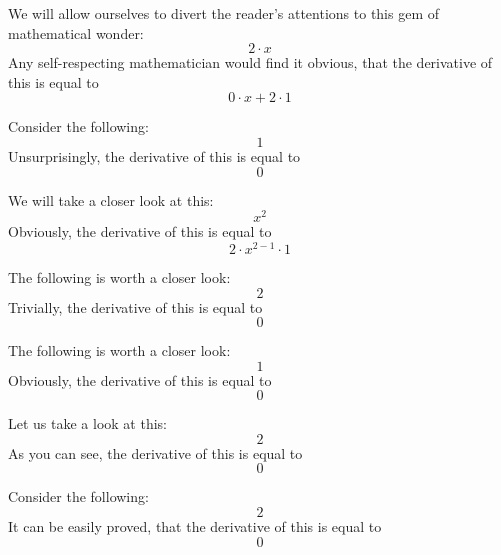 \documentclass{article}
\begin{document}
We will allow ourselves to divert the reader's attentions to this gem of mathematical wonder:
\begin{equation}
2 \cdot x 
\end{equation}
Any self-respecting mathematician would find it obvious, that the derivative of this is equal to
\begin{equation}
0 \cdot x + 2 \cdot 1 
\end{equation}

Consider the following:
\begin{equation}
1 
\end{equation}
Unsurprisingly, the derivative of this is equal to
\begin{equation}
0 
\end{equation}

We will take a closer look at this:
\begin{equation}
x ^{2 } 
\end{equation}
Obviously, the derivative of this is equal to
\begin{equation}
2 \cdot x ^{2 - 1 } \cdot 1 
\end{equation}

The following is worth a closer look:
\begin{equation}
2 
\end{equation}
Trivially, the derivative of this is equal to
\begin{equation}
0 
\end{equation}

The following is worth a closer look:
\begin{equation}
1 
\end{equation}
Obviously, the derivative of this is equal to
\begin{equation}
0 
\end{equation}

Let us take a look at this:
\begin{equation}
2 
\end{equation}
As you can see, the derivative of this is equal to
\begin{equation}
0 
\end{equation}

Consider the following:
\begin{equation}
2 
\end{equation}
It can be easily proved, that the derivative of this is equal to
\begin{equation}
0 
\end{equation}
\end{document}
